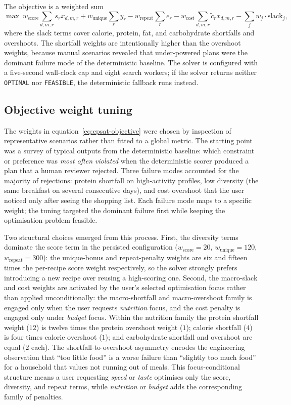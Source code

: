 The objective is a weighted sum
\begin{equation}
\max\ w_{\text{score}} \sum_{d,m,r} s_r x_{d,m,r} + w_{\text{unique}} \sum_{r} y_r - w_{\text{repeat}} \sum_{r} e_r - w_{\text{cost}} \sum_{d,m,r} \tilde{c}_r x_{d,m,r} - \sum_{j} w_j \cdot \mathrm{slack}_j,
\label{eq:cpsat-objective}
\end{equation}
where the slack terms cover calorie, protein, fat, and carbohydrate shortfalls and overshoots. The shortfall weights are intentionally higher than the overshoot weights, because manual scenarios revealed that under-powered plans were the dominant failure mode of the deterministic baseline. The solver is configured with a five-second wall-clock cap and eight search workers; if the solver returns neither \texttt{OPTIMAL} nor \texttt{FEASIBLE}, the deterministic fallback runs instead.

\subsection{Objective weight tuning}

The weights in equation~\ref{eq:cpsat-objective} were chosen by inspection of representative scenarios rather than fitted to a global metric. The starting point was a survey of typical outputs from the deterministic baseline: which constraint or preference was \emph{most often violated} when the deterministic scorer produced a plan that a human reviewer rejected. Three failure modes accounted for the majority of rejections: protein shortfall on high-activity profiles, low diversity (the same breakfast on several consecutive days), and cost overshoot that the user noticed only after seeing the shopping list. Each failure mode maps to a specific weight; the tuning targeted the dominant failure first while keeping the optimisation problem feasible.

Two structural choices emerged from this process. First, the diversity terms dominate the score term in the persisted configuration ($w_{\text{score}}=20$, $w_{\text{unique}}=120$, $w_{\text{repeat}}=300$): the unique-bonus and repeat-penalty weights are six and fifteen times the per-recipe score weight respectively, so the solver strongly prefers introducing a new recipe over reusing a high-scoring one. Second, the macro-slack and cost weights are activated by the user's selected optimisation focus rather than applied unconditionally: the macro-shortfall and macro-overshoot family is engaged only when the user requests \emph{nutrition} focus, and the cost penalty is engaged only under \emph{budget} focus. Within the nutrition family the protein shortfall weight ($12$) is twelve times the protein overshoot weight ($1$); calorie shortfall ($4$) is four times calorie overshoot ($1$); and carbohydrate shortfall and overshoot are equal ($2$ each). The shortfall-to-overshoot asymmetry encodes the engineering observation that ``too little food'' is a worse failure than ``slightly too much food'' for a household that values not running out of meals. This focus-conditional structure means a user requesting \emph{speed} or \emph{taste} optimises only the score, diversity, and repeat terms, while \emph{nutrition} or \emph{budget} adds the corresponding family of penalties.

